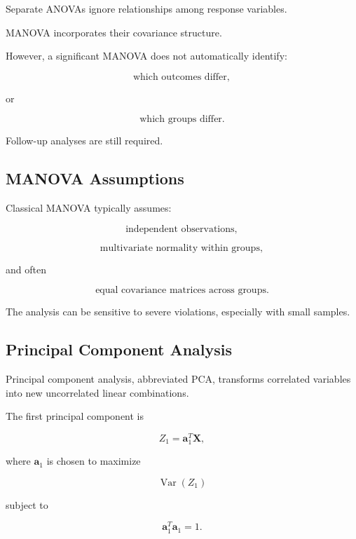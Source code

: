 Separate ANOVAs ignore relationships among response variables.

MANOVA incorporates their covariance structure.

However, a significant MANOVA does not automatically identify:

\[
\boxed{
\text{which outcomes differ},
}
\]

or

\[
\boxed{
\text{which groups differ}.
}
\]

Follow-up analyses are still required.

\subsection{MANOVA Assumptions}
\label{subsec:manova-assumptions}

Classical MANOVA typically assumes:

\[
\boxed{
\text{independent observations},
}
\]

\[
\boxed{
\text{multivariate normality within groups},
}
\]

and often

\[
\boxed{
\text{equal covariance matrices across groups}.
}
\]

The analysis can be sensitive to severe violations, especially with
small samples.

\subsection{Principal Component Analysis}
\label{subsec:principal-component-analysis}

Principal component analysis, abbreviated PCA, transforms correlated
variables into new uncorrelated linear combinations.

The first principal component is

\[
\boxed{
Z_1
=
\mathbf{a}_1^T\mathbf{X},
}
\]

where \(\mathbf{a}_1\) is chosen to maximize

\[
\operatorname{Var}(Z_1)
\]

subject to

\[
\boxed{
\mathbf{a}_1^T\mathbf{a}_1=1.
}
\]

